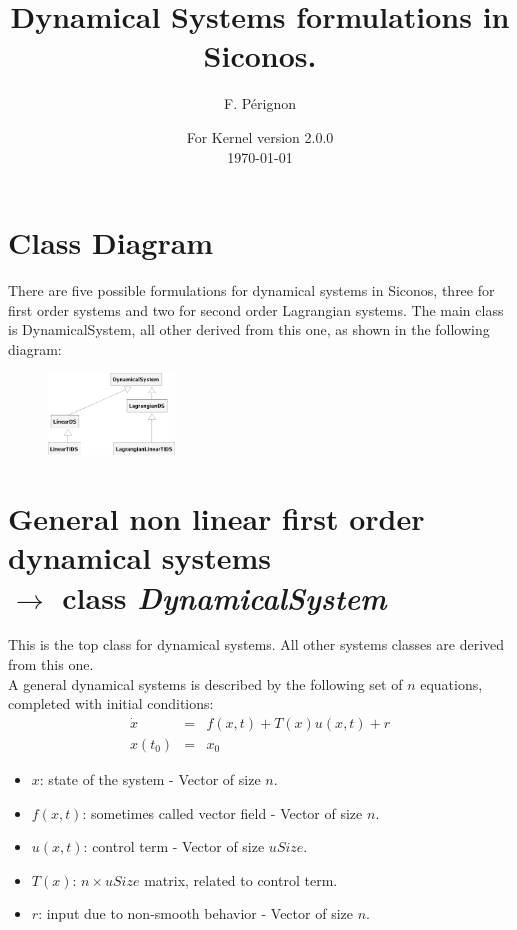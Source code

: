 \documentclass[10pt]{article}
\begin{document}
\thispagestyle{empty}
\title{Dynamical Systems formulations in Siconos.}
\author{F. P\'erignon}

\date{For Kernel version 2.0.0 \\
 \today}
\maketitle

\pagestyle{fancy}

\section{Class Diagram}
There are five possible formulations for dynamical systems in Siconos,
three for first order systems and two for second order Lagrangian systems. The main class is DynamicalSystem, all other derived from this one, as shown in the following diagram:
\begin{figure}[htbp]
  \centering
 \includegraphics[width=0.3\textwidth]{./DSClassDiagram.eps}
  \label{DSDiagram}
\end{figure}
\section{General non linear first order dynamical systems \\ $\rightarrow$ class \it{DynamicalSystem}}
This is the top class for dynamical systems. All other systems classes are derived from this one. \\

A general dynamical systems is described by the following set of $n$ equations, completed with initial conditions:
\begin{eqnarray} \label{firstOrderSystem}
  \dot x &=& f(x,t) + T(x) u(x, t) + r \\
  x(t_0)&=&x_0 
\end{eqnarray}

\begin{itemize}
\item $x$: state of the system - Vector of size $n$.
\item $f(x,t)$: sometimes called vector field - Vector of size $n$.
\item $u(x, t)$: control term - Vector of size $uSize$.
\item $T(x)$: $n\times uSize$ matrix, related to control term.
\item $r$: input due to non-smooth behavior - Vector of size $n$.
\end{itemize}
\end{document}
